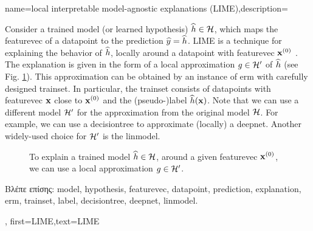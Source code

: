 {name={local interpretable model-agnostic explanations (LIME)},description={
		Consider 
		a trained \gls{model} (or learned \gls{hypothesis}) $\widehat{h} \in \mathcal{H}$, 
		which maps the \gls{featurevec} of a \gls{datapoint} to the \gls{prediction} $\widehat{y}= \widehat{h}$. 
		LIME is a technique for explaining 
		the behavior of $\widehat{h}$, locally around a \gls{datapoint} with \gls{featurevec} ${\bf x}^{(0)}$ \cite{Ribeiro2016}. 
		The \gls{explanation} is given in the form of a local approximation $g \in \mathcal{H}'$ of $\widehat{h}$ (see Fig. \ref{fig_lime}). 
		This approximation can be obtained by an instance of \gls{erm} with carefully designed 
		\gls{trainset}. In particular, the \gls{trainset} consists of \gls{datapoint}s with 
		\gls{featurevec} ${\bf x}$ close to ${\bf x}^{(0)}$ and the (pseudo-)\gls{label} $\widehat{h}({\bf x})$. 
		Note that we can use a different \gls{model} $\mathcal{H}'$ for the approximation from 
		the original \gls{model} $\mathcal{H}$. For example, we can use a \gls{decisiontree} 
		to approximate (locally) a \gls{deepnet}. Another widely-used choice for $\mathcal{H}'$ is 
		the \gls{linmodel}. 
		\begin{figure}[H]
		\begin{center}
		\end{center}
		\caption{To explain a trained \gls{model} $\widehat{h} \in \mathcal{H}$, around a 
		given \gls{featurevec} ${\bf x}^{(0)}$, we can use a local approximation $g \in \mathcal{H}'$. }
		\label{fig_lime}
		\end{figure}
		\foreignlanguage{greek}{Βλέπε επίσης:} \gls{model}, \gls{hypothesis}, \gls{featurevec}, \gls{datapoint}, \gls{prediction}, \gls{explanation}, \gls{erm}, \gls{trainset}, \gls{label}, \gls{decisiontree}, \gls{deepnet}, \gls{linmodel}.},
	first={LIME},text={LIME}
}
	
